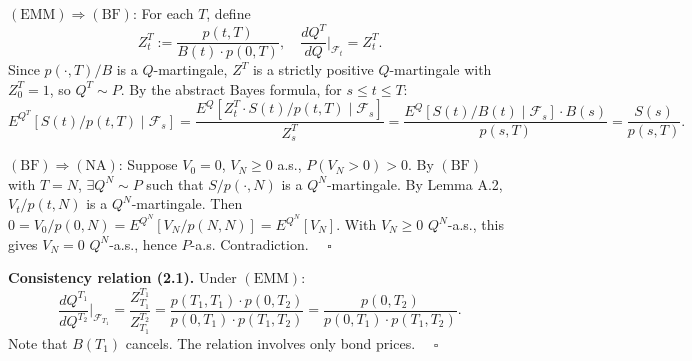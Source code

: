 \documentclass[
]{article}
\begin{document}
\((\text{EMM}) \Rightarrow (\text{BF})\): For each \(T\), define
\[Z^T_t := \frac{p(t,T)}{B(t) \cdot p(0,T)}, \quad
  \frac{dQ^T}{dQ}\bigg|_{\mathcal{F}_t} = Z^T_t.\] Since
\(p(\cdot,T)/B\) is a \(Q\)-martingale, \(Z^T\) is a strictly positive
\(Q\)-martingale with \(Z^T_0 = 1\), so \(Q^T \sim P\). By the abstract
Bayes formula, for \(s \le t \le T\):
\[E^{Q^T}[S(t)/p(t,T) \mid \mathcal{F}_s]
  = \frac{E^Q[Z^T_t \cdot S(t)/p(t,T) \mid \mathcal{F}_s]}{Z^T_s}
  = \frac{E^Q[S(t)/B(t) \mid \mathcal{F}_s] \cdot B(s)}{p(s,T)}
  = \frac{S(s)}{p(s,T)}.\]

\((\text{BF}) \Rightarrow (\text{NA})\): Suppose \(V_0 = 0\),
\(V_N \ge 0\) a.s., \(P(V_N > 0) > 0\). By \((\text{BF})\) with
\(T = N\), \(\exists Q^N \sim P\) such that \(S/p(\cdot,N)\) is a
\(Q^N\)-martingale. By Lemma A.2, \(V_t/p(t,N)\) is a
\(Q^N\)-martingale. Then \(0 = V_0/p(0,N) = E^{Q^N}[V_N/p(N,N)]
= E^{Q^N}[V_N]\). With \(V_N \ge 0\) \(Q^N\)-a.s., this gives
\(V_N = 0\) \(Q^N\)-a.s., hence \(P\)-a.s. Contradiction.
\(\quad\square\)

\textbf{Consistency relation (2.1).} Under \((\text{EMM})\):
\[\frac{dQ^{T_1}}{dQ^{T_2}}\bigg|_{\mathcal{F}_{T_1}}
  = \frac{Z^{T_1}_{T_1}}{Z^{T_2}_{T_1}}
  = \frac{p(T_1,T_1) \cdot p(0,T_2)}{p(0,T_1) \cdot p(T_1,T_2)}
  = \frac{p(0,T_2)}{p(0,T_1) \cdot p(T_1,T_2)}.\] Note that \(B(T_1)\)
cancels. The relation involves only bond prices. \(\quad\square\)




\end{document}
